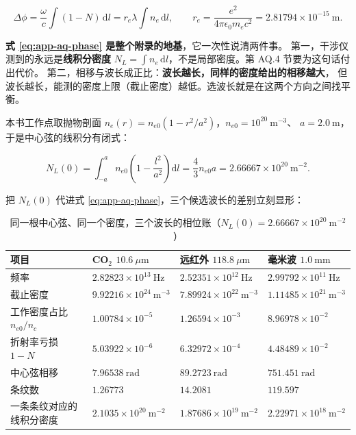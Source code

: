 \begin{equation}
\Delta\phi = \frac{\omega}{c}\int(1-N)\,\mathrm{d}l
= r_e\lambda\int n_e\,\mathrm{d}l,
\qquad
r_e = \frac{e^2}{4\pi\epsilon_0m_ec^2} = 2.81794\times10^{-15}\ \mathrm{m}.
\label{eq:app-aq-phase}
\end{equation}

\textbf{式 \eqref{eq:app-aq-phase} 是整个附录的地基}，它一次性说清两件事。
第一，干涉仪测到的永远是\textbf{线积分密度}
$N_L = \int n_e\,\mathrm{d}l$，不是局部密度。第 AQ.4 节要为这句话付出代价。
第二，相移与波长成正比：\textbf{波长越长，同样的密度给出的相移越大}，
但波长越长，能测的密度上限（截止密度）越低。选波长就是在这两个方向之间找平衡。

本书工作点取抛物剖面 $n_e(r) = n_{e0}(1-r^2/a^2)$，$n_{e0} = 10^{20}\ \mathrm{m^{-3}}$、
$a = 2.0\ \mathrm{m}$，于是中心弦的线积分有闭式：

\begin{equation}
N_L(0) = \int_{-a}^{a} n_{e0}\left(1-\frac{l^2}{a^2}\right)\mathrm{d}l
= \frac{4}{3}n_{e0}a = 2.66667\times10^{20}\ \mathrm{m^{-2}}.
\label{eq:app-aq-lineint}
\end{equation}

把 $N_L(0)$ 代进式 \eqref{eq:app-aq-phase}，三个候选波长的差别立刻显形：

\begin{table}[htbp]
\centering
\small
\caption{同一根中心弦、同一个密度，三个波长的相位账（$N_L(0) = 2.66667\times10^{20}\ \mathrm{m^{-2}}$）}
\label{tab:app-aq-phase}
\setlength{\tabcolsep}{4pt}
\begin{tabular}{p{3.2cm}p{3.0cm}p{3.0cm}p{3.0cm}}
\toprule
项目 & CO$_2$ $10.6\ \mu\mathrm{m}$ & 远红外 $118.8\ \mu\mathrm{m}$ & 毫米波 $1.0\ \mathrm{mm}$ \\
\midrule
频率 & $2.82823\times10^{13}\ \mathrm{Hz}$ & $2.52351\times10^{12}\ \mathrm{Hz}$ & $2.99792\times10^{11}\ \mathrm{Hz}$ \\
截止密度 & $9.92216\times10^{24}\ \mathrm{m^{-3}}$ & $7.89924\times10^{22}\ \mathrm{m^{-3}}$ & $1.11485\times10^{21}\ \mathrm{m^{-3}}$ \\
工作密度占比 $n_{e0}/n_c$ & $1.00784\times10^{-5}$ & $1.26594\times10^{-3}$ & $8.96978\times10^{-2}$ \\
折射率亏损 $1-N$ & $5.03922\times10^{-6}$ & $6.32972\times10^{-4}$ & $4.48489\times10^{-2}$ \\
中心弦相移 & $7.96538\ \mathrm{rad}$ & $89.2723\ \mathrm{rad}$ & $751.451\ \mathrm{rad}$ \\
条纹数 & $1.26773$ & $14.2081$ & $119.597$ \\
一条条纹对应的线积分密度 & $2.1035\times10^{20}\ \mathrm{m^{-2}}$ & $1.87686\times10^{19}\ \mathrm{m^{-2}}$ & $2.22971\times10^{18}\ \mathrm{m^{-2}}$ \\
\bottomrule
\end{tabular}
\end{table}

